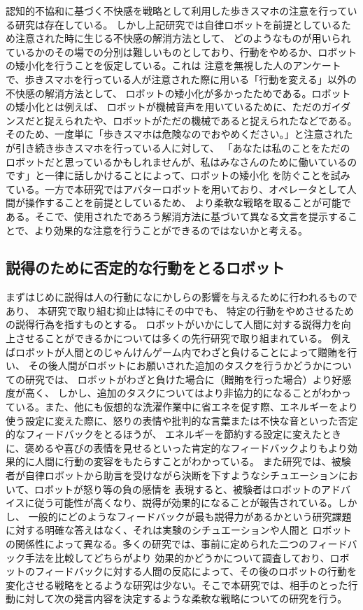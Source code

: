 \documentclass{kuisthesis}
\begin{document}
認知的不協和に基づく不快感を戦略として利用した歩きスマホの注意を行っている研究は存在している\cite{Schneider2022}。
しかし上記研究では自律ロボットを前提としているため注意された時に生じる不快感の解消方法として、
どのようなものが用いられているかのその場での分別は難しいものとしており、行動をやめるか、ロボットの矮小化を行うことを仮定している。これは
注意を無視した人のアンケートで、歩きスマホを行っている人が注意された際に用いる「行動を変える」以外の不快感の解消方法として、
ロボットの矮小化が多かったためである。ロボットの矮小化とは例えば、
ロボットが機械音声を用いているために、ただのガイダンスだと捉えられたや、ロボットがただの機械であると捉えられたなどである。
そのため、一度単に「歩きスマホは危険なのでおやめください。」と注意されたが引き続き歩きスマホを行っている人に対して、
「あなたは私のことをただのロボットだと思っているかもしれませんが、私はみなさんのために働いているのです」と一律に話しかけることによって、ロボットの矮小化
を防ぐことを試みている。一方で本研究ではアバターロボットを用いており、オペレータとして人間が操作することを前提としているため、
より柔軟な戦略を取ることが可能である。そこで、使用されたであろう解消方法に基づいて異なる文言を提示することで、より効果的な注意を行うことができるのではないかと考える。

\subsection{説得のために否定的な行動をとるロボット}
まずはじめに説得は人の行動になにかしらの影響を与えるために行われるものであり、
本研究で取り組む抑止は特にその中でも、
特定の行動をやめさせるための説得行為を指すものとする。
ロボットがいかにして人間に対する説得力を向上させることができるかについては多くの先行研究で取り組まれている。
例えばロボットが人間とのじゃんけんゲーム内でわざと負けることによって贈賄を行い、
その後人間がロボットにお願いされた追加のタスクを行うかどうかについての研究\cite{sandoval2016can}では、
ロボットがわざと負けた場合に（贈賄を行った場合）より好感度が高く、
しかし、追加のタスクについてはより非協力的になることがわかっている。また、他にも仮想的な洗濯作業中に省エネを促す際、エネルギーをより使う設定に変えた際に、怒りの表情や批判的な言葉または不快な音といった否定的なフィードバックをとるほうが、
エネルギーを節約する設定に変えたときに、褒めるや喜びの表情を見せるといった肯定的なフィードバックよりもより効果的に人間に行動の変容をもたらすことがわかっている\cite{Midden2009}。
また研究\cite{paradeda2019makes}では、被験者が自律ロボットから助言を受けながら決断を下すようなシチュエーションにおいて、ロボットが怒り等の負の感情を
表現すると、被験者はロボットのアドバイスに従う可能性が高くなり、説得が効果的になることが報告されている。しかし、
一般的にどのようなフィードバックが最も説得力があるかという研究課題に対する明確な答えはなく、それは実験のシチュエーションや人間と
ロボットの関係性によって異なる。多くの研究では、事前に定められた二つのフィードバック手法を比較してどちらがより
効果的かどうかについて調査しており、ロボットのフィードバックに対する人間の反応によって、その後のロボットの行動を
変化させる戦略をとるような研究は少ない。そこで本研究では、相手のとった行動に対して次の発言内容を決定するような柔軟な戦略についての研究を行う。
\end{document}
